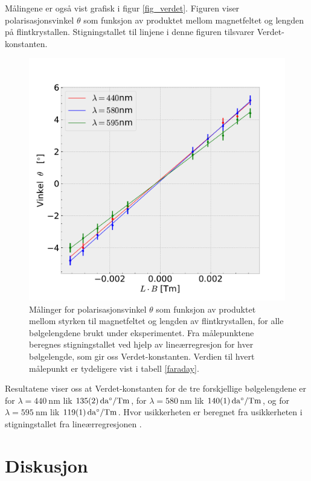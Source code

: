\documentclass[%
 reprint,
 amsmath,amssymb,
 aps,
 norsk,
]{revtex4-1}
\begin{document}
Målingene er også vist grafisk i figur \vref{fig_verdet}. Figuren viser polarisasjonsvinkel $\theta$ som funksjon av produktet mellom magnetfeltet og lengden på flintkrystallen. Stigningstallet til linjene i denne figuren tilsvarer Verdet-konstanten.
\begin{figure}[ht!]
  \centering
  \includegraphics[scale=0.45]{faraday_effekt.pdf}
  \caption{Målinger for polarisasjonsvinkel $\theta$ som funksjon av produktet mellom styrken til magnetfeltet og lengden av flintkrystallen, for alle bølgelengdene brukt under eksperimentet. Fra målepunktene beregnes stigningstallet ved hjelp av lineærregresjon for hver bølgelengde, som gir oss Verdet-konstanten. Verdien til hvert målepunkt er tydeligere vist i tabell \vref{faraday}.}
  \label{fig_verdet}
\end{figure}
Resultatene viser oss at Verdet-konstanten for de tre forskjellige bølgelengdene er for $\lambda = \SI{440}{\nano\meter}$ lik $\SI{135\pm2}{\deca\degree/\tesla\meter}$, for $\lambda = \SI{580}{\nano\meter}$ lik $\SI{140\pm1}{\deca\degree/\tesla\meter}$, og for $\lambda = \SI{595}{\nano\meter}$ lik
$\SI{119\pm1}{\deca\degree/\tesla\meter}$. Hvor usikkerheten er beregnet fra usikkerheten i stigningstallet fra lineærregresjonen \cite{squires}.
\section{Diskusjon}
\end{document}
